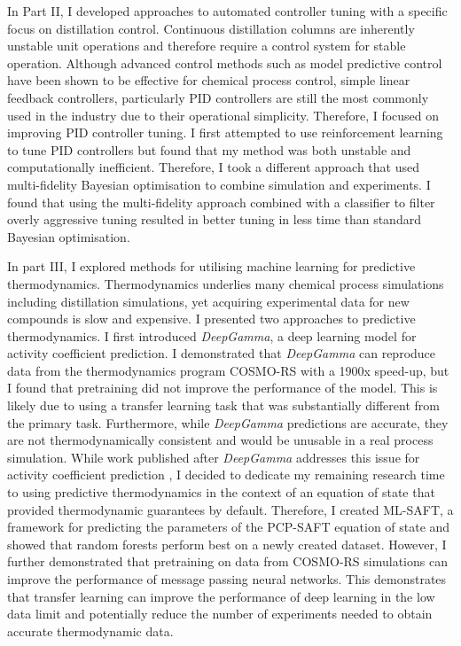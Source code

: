 In Part II, I developed approaches to automated controller tuning with a specific focus on distillation control. Continuous distillation columns are inherently unstable unit operations and therefore require a control system for stable operation. Although advanced control methods such as model predictive control have been shown to be effective for chemical process control, simple linear feedback controllers, particularly PID controllers are still the most commonly used in the industry due to their operational simplicity. Therefore, I focused on improving PID controller tuning. I first attempted to use reinforcement learning to tune PID controllers but found that my method was both unstable and computationally inefficient. Therefore, I took a different approach that used multi-fidelity Bayesian optimisation to combine simulation and experiments.  I found that using the multi-fidelity approach combined with a classifier to filter overly aggressive tuning resulted in better tuning in less time than standard Bayesian optimisation.


In part III, I explored methods for utilising machine learning for predictive thermodynamics. Thermodynamics underlies many chemical process simulations including distillation simulations, yet acquiring experimental  data for new compounds is slow and expensive. I presented two approaches to predictive thermodynamics.  I first introduced \textit{DeepGamma}, a deep learning model for activity coefficient prediction. I demonstrated that \textit{DeepGamma} can reproduce data from the thermodynamics program COSMO-RS with a 1900x speed-up, but I found that pretraining  did not improve the performance of the model. This is likely due to using a transfer learning task that was substantially different from the primary task. Furthermore, while \textit{DeepGamma} predictions are accurate, they are not thermodynamically consistent and would be unusable in a real process simulation. While work published after \textit{DeepGamma} addresses this issue for activity coefficient prediction \cite{Winter2022, SanchezMedina2022}, I decided to dedicate my remaining research time to using predictive thermodynamics in the context of an equation of state that provided thermodynamic guarantees by default. Therefore, I created ML-SAFT, a framework for predicting the parameters of the PCP-SAFT equation of state and showed that random forests perform best on a newly created dataset. However, I further demonstrated that pretraining on data from COSMO-RS simulations can improve the performance of message passing neural networks. This demonstrates that transfer learning can improve the performance of deep learning in the low data limit and potentially reduce the number of experiments needed to obtain accurate thermodynamic data.

